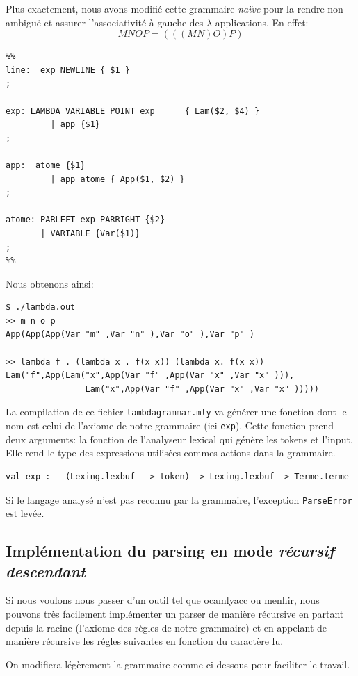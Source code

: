 Plus exactement, nous avons modifié cette grammaire \textit{naïve} pour la
rendre non ambiguë et assurer l'associativité à gauche des
$\lambda$-applications.
En effet: 
$$ M N O P = (((M N) O) P) $$
\begin{Verbatim}
%% 
line:  exp NEWLINE { $1 }
;

exp: LAMBDA VARIABLE POINT exp		{ Lam($2, $4) }
		 | app {$1}
;

app:  atome {$1}
		 | app atome { App($1, $2) }
;

atome: PARLEFT exp PARRIGHT {$2}
       | VARIABLE {Var($1)}
;		
%%
\end{Verbatim}
Nous obtenons ainsi:
\begin{Verbatim}
$ ./lambda.out
>> m n o p
App(App(App(Var "m" ,Var "n" ),Var "o" ),Var "p" )

>> lambda f . (lambda x . f(x x)) (lambda x. f(x x))
Lam("f",App(Lam("x",App(Var "f" ,App(Var "x" ,Var "x" ))),
				Lam("x",App(Var "f" ,App(Var "x" ,Var "x" )))))
\end{Verbatim}



La compilation de ce fichier \texttt{lambdagrammar.mly} va générer une fonction dont le nom
est celui de l'axiome de notre grammaire (ici \texttt{exp}). Cette fonction prend deux arguments: la fonction de l'analyseur lexical qui génère les tokens et l'input. Elle rend le type
des expressions utilisées commes actions dans la grammaire.
\begin{Verbatim}
val exp :   (Lexing.lexbuf  -> token) -> Lexing.lexbuf -> Terme.terme
\end{Verbatim}

 Si le langage analysé n'est pas reconnu par la grammaire, l'exception \texttt{ParseError} est levée.
 \subsection{Implémentation du parsing en mode \textit{récursif descendant}}
 
 Si nous voulons nous passer d'un outil tel que ocamlyacc ou menhir, nous pouvons très facilement implémenter un parser
 de manière récursive en partant depuis la racine (l'axiome des règles de notre grammaire) et en appelant de manière récursive les
 régles suivantes en fonction du caractère lu.
 
 On modifiera légèrement la grammaire comme ci-dessous pour faciliter le travail.
 
